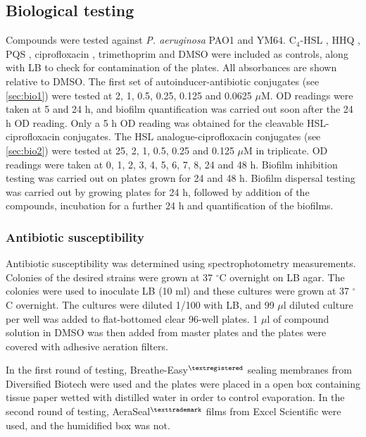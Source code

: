 \subsection{Biological testing\label{sec:exp_bio}}

Compounds were tested against \textit{P. aeruginosa} PAO1\cite{Stover2000} and YM64\cite{Morita2001}.
C$_4$-HSL , HHQ , PQS , ciprofloxacin , trimethoprim  and DMSO were included as controls, along with LB to check for contamination of the plates. All absorbances are shown relative to DMSO.
The first set of autoinducer-antibiotic conjugates (see \ref{sec:bio1}) were tested at 2, 1, 0.5, 0.25, 0.125 and 0.0625 $\mu$M. OD readings were taken at 5 and 24 h, and biofilm quantification was carried out soon after the 24 h OD reading. Only a 5 h OD reading was obtained for the cleavable HSL-ciprofloxacin conjugates.
The HSL analogue-ciprofloxacin conjugates (see \ref{sec:bio2}) were tested at 25, 2, 1, 0.5, 0.25 and 0.125 $\mu$M in triplicate. OD readings were taken at 0, 1, 2, 3, 4, 5, 6, 7, 8, 24 and 48 h. Biofilm inhibition testing was carried out on plates grown for 24 and 48 h. Biofilm dispersal testing was carried out by growing plates for 24 h, followed by addition of the compounds, incubation for a further 24 h and quantification of the biofilms.

\subsubsection{Antibiotic susceptibility\label{sec:ABsus}}

Antibiotic susceptibility was determined using spectrophotometry measurements.
Colonies of the desired strains were grown at 37 $^{\circ}$C overnight on LB agar.
The colonies were used to inoculate LB (10 ml) and these cultures were grown at 37 $^{\circ}$C overnight. 
The cultures were diluted 1/100 with LB, and 99 $\mu$l diluted culture per well was added to flat-bottomed clear 96-well plates. 1 $\mu$l of compound solution in DMSO was then added from master plates and the plates were covered with adhesive aeration filters. 

In the first round of testing, Breathe-Easy$^{\tiny{\textregistered}}$ sealing membranes from Diversified Biotech were used and the plates were placed in a open box containing tissue paper wetted with distilled water in order to control evaporation. 
In the second round of testing, AeraSeal$^{\tiny{\texttrademark}}$ films from Excel Scientific were used, and the humidified box was not.

